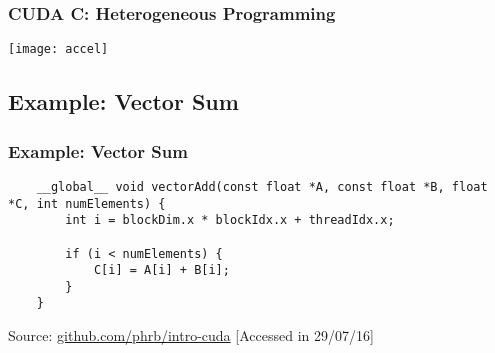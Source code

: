 \documentclass[10pt, compress]{beamer}
\begin{document}
\begin{frame}
    \frametitle{CUDA C: Heterogeneous Programming}
    \centering
    \texttt{[image: accel]}
\end{frame}

\subsection{Example: Vector Sum}

\begin{frame}[fragile]
    \frametitle{Example: Vector Sum}
    \begin{lstlisting}
    __global__ void vectorAdd(const float *A, const float *B, float *C, int numElements) {
        int i = blockDim.x * blockIdx.x + threadIdx.x;

        if (i < numElements) {
            C[i] = A[i] + B[i];
        }
    }
    \end{lstlisting}

    \vfill

    \begin{center}
        \tiny{Source: \url{github.com/phrb/intro-cuda} [Accessed in 29/07/16]}
    \end{center}
\end{frame}
\end{document}
